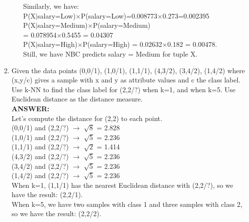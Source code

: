 \documentclass{article}
\begin{document}
\begin{enumerate}
\begin{enumerate}
Similarly, we have: \\
P(X$|$salary=Low)$\times$P(salary=Low)=0.008773$\times$0.273=0.002395\\
P(X$|$salary=Medium)$\times$P(salary=Medium) \\
= 0.078954$\times$0.5455 = 0.04307 \\
P(X$|$salary=High)$\times$P(salary=High) = 0.02632$\times$0.182 =
0.00478. \\
Still, we have NBC predicts salary = Medium for tuple X.
\end{enumerate} %

\item Given the data points (0,0/1), (1,0/1), (1,1/1), (4,3/2),
  (3,4/2), (1,4/2) where (x,y/c) gives a sample with x and y as
  attribute values and c the class label. Use k-NN to find the class
  label for (2,2/?) when k=1, and when k=5. Use Euclidean distance as
  the distance measure. \\ 
\textbf{ANSWER:} \\
Let's compute the distance for (2,2) to each point. \\
(0,0/1) and (2,2/?) $\rightarrow$ $\sqrt{8}$ = 2.828\\
(1,0/1) and (2,2/?) $\rightarrow$ $\sqrt{5}$ = 2.236\\
(1,1/1) and (2,2/?) $\rightarrow$ $\sqrt{2}$ = 1.414\\ 
(4,3/2) and (2,2/?) $\rightarrow$ $\sqrt{5}$ = 2.236\\
(3,4/2) and (2,2/?) $\rightarrow$ $\sqrt{5}$ = 2.236\\
(1,4/2) and (2,2/?) $\rightarrow$ $\sqrt{5}$ = 2.236\\

When k=1, (1,1/1) has the nearest Euclidean distance with (2,2/?), so
we have the result: (2,2/1).\\

When k=5, we have two samples with class 1 and three samples with
class 2, so we have the result: (2,2/2).


\end{enumerate} %
\end{document}
